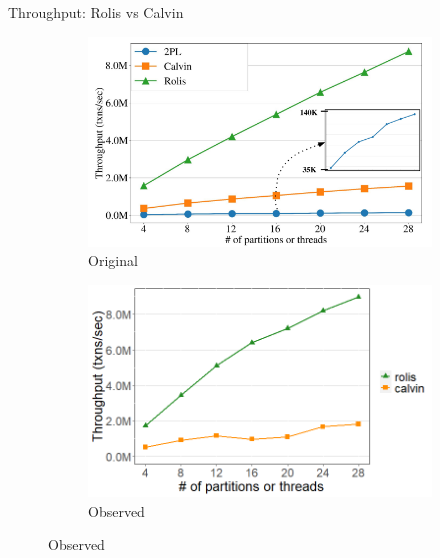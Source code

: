\documentclass[notes, xcolor=dvipsnames]{beamer}
\begin{document}
    \begin{frame}{Throughput: Rolis vs Calvin}
        \begin{figure}
            \begin{subfigure}[h]{0.5\linewidth}
                \includegraphics[scale=0.40]{rolis_fig12.png}
                \caption{Original}
            \end{subfigure}%
            \hfill
            \begin{subfigure}[h]{0.5\linewidth}
                \includegraphics[scale=0.30]{fig12.png}
                \caption{Observed}
            \end{subfigure}           
        \end{figure}
    \end{frame}
\end{document}

